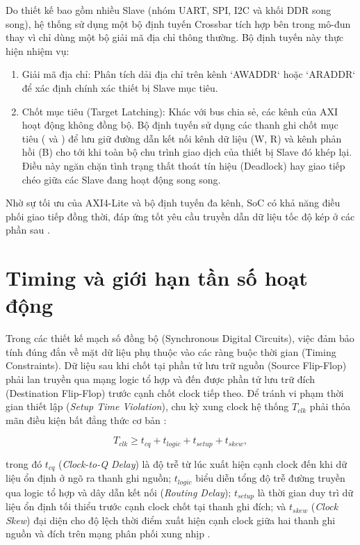 Do thiết kế bao gồm nhiều Slave (nhóm UART, SPI, I2C và khối DDR song song), hệ thống sử dụng một bộ định tuyến Crossbar tích hợp bên trong mô-đun  thay vì chỉ dùng một bộ giải mã địa chỉ thông thường. Bộ định tuyến này thực hiện nhiệm vụ:
\begin{enumerate}
    \item {Giải mã địa chỉ:} Phân tích dải địa chỉ trên kênh `AWADDR` hoặc `ARADDR` để xác định chính xác thiết bị Slave mục tiêu.
    \item {Chốt mục tiêu (Target Latching):} Khác với bus chia sẻ, các kênh của AXI hoạt động không đồng bộ. Bộ định tuyến sử dụng các thanh ghi chốt mục tiêu ( và ) để lưu giữ đường dẫn kết nối kênh dữ liệu (W, R) và kênh phản hồi (B) cho tới khi toàn bộ chu trình giao dịch của thiết bị Slave đó khép lại. Điều này ngăn chặn tình trạng thất thoát tín hiệu (Deadlock) hay giao tiếp chéo giữa các Slave đang hoạt động song song.
\end{enumerate}

Nhờ sự tối ưu của AXI4-Lite và bộ định tuyến đa kênh, SoC có khả năng điều phối giao tiếp đồng thời, đáp ứng tốt yêu cầu truyền dẫn dữ liệu tốc độ kép ở các phần sau \cite{amd_axi4lite_hls,emil2023axiinterconnect}.

\section{Timing và giới hạn tần số hoạt động}

Trong các thiết kế mạch số đồng bộ (Synchronous Digital Circuits), việc đảm bảo tính đúng đắn về mặt dữ liệu phụ thuộc vào các ràng buộc thời gian (Timing Constraints). Dữ liệu sau khi chốt tại phần tử lưu trữ nguồn (Source Flip-Flop) phải lan truyền qua mạng logic tổ hợp và đến được phần tử lưu trữ đích (Destination Flip-Flop) trước cạnh chốt clock tiếp theo. Để tránh vi phạm thời gian thiết lập (\textit{Setup Time Violation}), chu kỳ xung clock hệ thống $T_{clk}$ phải thỏa mãn điều kiện bất đẳng thức cơ bản \cite{amd_ug949}:

\begin{equation}
T_{clk} \geq t_{cq} + t_{logic} + t_{setup} + t_{skew},
\end{equation}

trong đó $t_{cq}$ (\textit{Clock-to-Q Delay}) là độ trễ từ lúc xuất hiện cạnh clock đến khi dữ liệu ổn định ở ngõ ra thanh ghi nguồn; $t_{logic}$ biểu diễn tổng độ trễ đường truyền qua logic tổ hợp và dây dẫn kết nối (\textit{Routing Delay}); $t_{setup}$ là thời gian duy trì dữ liệu ổn định tối thiểu trước cạnh clock chốt tại thanh ghi đích; và $t_{skew}$ (\textit{Clock Skew}) đại diện cho độ lệch thời điểm xuất hiện cạnh clock giữa hai thanh ghi nguồn và đích trên mạng phân phối xung nhịp \cite{amd_ug949}.

